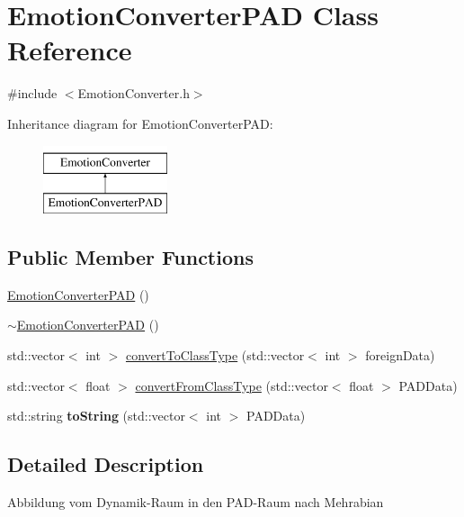 \hypertarget{class_emotion_converter_p_a_d}{
\section{\-Emotion\-Converter\-P\-A\-D \-Class \-Reference}
\label{class_emotion_converter_p_a_d}
}


{\ttfamily \#include $<$\-Emotion\-Converter.\-h$>$}

\-Inheritance diagram for \-Emotion\-Converter\-P\-A\-D\-:\begin{figure}[H]
\begin{center}
\leavevmode
\includegraphics[height=2.000000cm]{class_emotion_converter_p_a_d}
\end{center}
\end{figure}
\subsection*{\-Public \-Member \-Functions}
\begin{DoxyCompactItemize}
\item 
\hyperlink{class_emotion_converter_p_a_d_a672f33449ce967e0f320e8a23b1a9483}{\-Emotion\-Converter\-P\-A\-D} ()
\item 
\hyperlink{class_emotion_converter_p_a_d_a7cd032a614fe93f04323424c70a5ceeb}{$\sim$\-Emotion\-Converter\-P\-A\-D} ()
\item 
std\-::vector$<$ int $>$ \hyperlink{class_emotion_converter_p_a_d_a0bea4550a37916737a01e57255721713}{convert\-To\-Class\-Type} (std\-::vector$<$ int $>$ foreign\-Data)
\item 
std\-::vector$<$ float $>$ \hyperlink{class_emotion_converter_p_a_d_ac1e57bfbadcefdaed62f4a8153709c64}{convert\-From\-Class\-Type} (std\-::vector$<$ float $>$ \-P\-A\-D\-Data)
\item 
\hypertarget{class_emotion_converter_p_a_d_a1ada22855bef77efa0f144b301168967}{
std\-::string {\bfseries to\-String} (std\-::vector$<$ int $>$ \-P\-A\-D\-Data)}
\label{class_emotion_converter_p_a_d_a1ada22855bef77efa0f144b301168967}

\end{DoxyCompactItemize}


\subsection{\-Detailed \-Description}
\-Abbildung vom \-Dynamik-\/\-Raum in den \-P\-A\-D-\/\-Raum nach \-Mehrabian 


